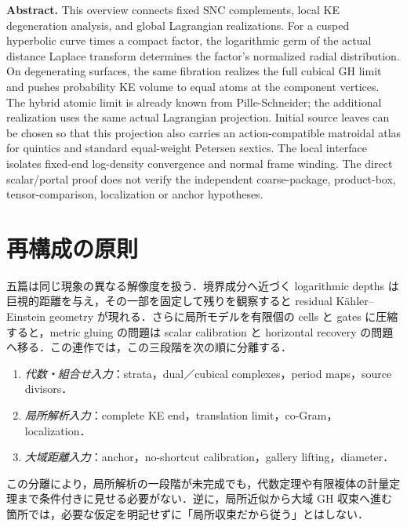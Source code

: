 \documentclass[a4paper,11pt]{ltjsarticle}
\numberwithin{equation}{section}
\theoremstyle{plain}
\theoremstyle{definition}
\theoremstyle{remark}
\begin{document}
\begin{center}
\begin{minipage}{0.93\textwidth}\small
\textbf{Abstract.}
This overview connects fixed SNC complements, local KE degeneration analysis, and global Lagrangian realizations. For a cusped hyperbolic curve times a compact factor, the logarithmic germ of the actual distance Laplace transform determines the factor's normalized radial distribution. On degenerating surfaces, the same fibration realizes the full cubical GH limit and pushes probability KE volume to equal atoms at the component vertices. The hybrid atomic limit is already known from Pille-Schneider; the additional realization uses the same actual Lagrangian projection. Initial source leaves can be chosen so that this projection also carries an action-compatible matroidal atlas for quintics and standard equal-weight Petersen sextics. The local interface isolates fixed-end log-density convergence and normal frame winding. The direct scalar/portal proof does not verify the independent coarse-package, product-box, tensor-comparison, localization or anchor hypotheses.
\end{minipage}
\end{center}

\clearpage
\tableofcontents

\section{再構成の原則}

五篇は同じ現象の異なる解像度を扱う．境界成分へ近づく logarithmic depths は巨視的距離を与え，その一部を固定して残りを観察すると residual K\"ahler--Einstein geometry が現れる．さらに局所モデルを有限個の cells と gates に圧縮すると，metric gluing の問題は scalar calibration と horizontal recovery の問題へ移る．この連作では，この三段階を次の順に分離する．

\begin{enumerate}[label=\textup{(P\arabic*)}]
\item \emph{代数・組合せ入力}：strata，dual／cubical complexes，period maps，source divisors．
\item \emph{局所解析入力}：complete KE end，translation limit，co-Gram，localization．
\item \emph{大域距離入力}：anchor，no-shortcut calibration，gallery lifting，diameter．
\end{enumerate}

この分離により，局所解析の一段階が未完成でも，代数定理や有限複体の計量定理まで条件付きに見せる必要がない．逆に，局所近似から大域 GH 収束へ進む箇所では，必要な仮定を明記せずに「局所収束だから従う」とはしない．
\end{document}
